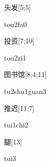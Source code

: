 \begin{verbete}[tou2fa0]{头发}[5;5]
\begin{pronuncia}{tou2fa0}
\end{pronuncia}
\end{verbete}

\begin{verbete}[tou2zi1]{投资}[7;10]
\begin{pronuncia}{tou2zi1}
\end{pronuncia}
\end{verbete}

\begin{verbete}{图书馆}[8;4;11]
\begin{pronuncia}{tu2shu1guan3}
\end{pronuncia}
\end{verbete}

\begin{verbete}{推迟}[11;7]
\begin{pronuncia}{tui1chi2}
\end{pronuncia}
\end{verbete}

\begin{verbete}[tui3]{腿}[13]
\begin{pronuncia}{tui3}
\end{pronuncia}
\end{verbete}

